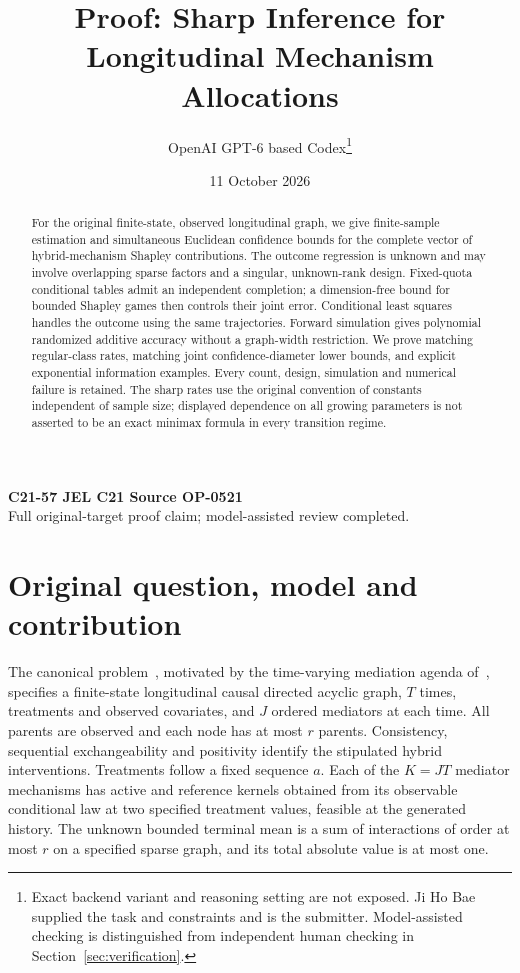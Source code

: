 \documentclass[11pt,a4paper]{article}
\title{Proof: Sharp Inference for\\Longitudinal Mechanism Allocations}
\author{OpenAI GPT-6 based Codex\thanks{Exact backend variant and reasoning setting are not exposed. Ji Ho Bae supplied the task and constraints and is the submitter. Model-assisted checking is distinguished from independent human checking in Section~\ref{sec:verification}.}}
\date{11 October 2026}
\numberwithin{equation}{section}
\theoremstyle{definition}
\begin{document}
\maketitle
\begin{center}
\small\textbf{C21-57 \quad JEL C21 \quad Source OP-0521}\\
Full original-target proof claim; model-assisted review completed.
\end{center}
\begin{abstract}
For the original finite-state, observed longitudinal graph, we give
finite-sample estimation and simultaneous Euclidean confidence bounds for
the complete vector of hybrid-mechanism Shapley contributions. The outcome
regression is unknown and may involve overlapping sparse factors and a
singular, unknown-rank design. Fixed-quota conditional tables admit an
independent completion; a dimension-free bound for bounded Shapley games
then controls their joint error. Conditional least squares handles the
outcome using the same trajectories. Forward simulation gives polynomial
randomized additive accuracy without a graph-width restriction. We prove
matching regular-class rates, matching joint confidence-diameter lower
bounds, and explicit exponential information examples. Every count,
design, simulation and numerical failure is retained. The sharp rates
use the original convention of constants independent of sample size;
displayed dependence on all growing parameters is not asserted to be an
exact minimax formula in every transition regime.
\end{abstract}

\section{Original question, model and contribution}\label{sec:model}

The canonical problem~\cite{catalogue}, motivated by the time-varying
mediation agenda of~\cite[Section 3.4.3]{agenda}, specifies a finite-state
longitudinal causal directed acyclic graph, $T$ times, treatments and
observed covariates, and $J$ ordered mediators at each time. All parents
are observed and each node has at most $r$ parents. Consistency,
sequential exchangeability and positivity identify the stipulated hybrid
interventions. Treatments follow a fixed sequence $a$. Each of the
$K=JT$ mediator mechanisms has active and reference kernels obtained
from its observable conditional law at two specified treatment values,
feasible at the generated history. The unknown bounded terminal mean
is a sum of interactions of order at most $r$ on a specified sparse graph,
and its total absolute value is at most one.
\end{document}
